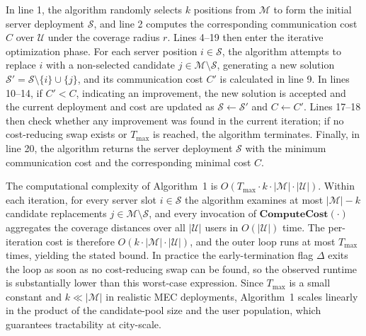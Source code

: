 \documentclass[10pt, conference, letterpaper]{IEEEtran}
\begin{document}
  In line 1, the algorithm randomly selects $k$ positions from $\mathcal{M}$ to form the initial server deployment
  $\mathcal{S}$, and line 2 computes the corresponding communication cost $C$ over $\mathcal{U}$ under the coverage
  radius $r$. Lines 4--19 then enter the iterative optimization phase. For each server position $i \in \mathcal{S}$, the
   algorithm attempts to replace $i$ with a non-selected candidate $j \in \mathcal{M} \setminus \mathcal{S}$, generating
   a new solution $\mathcal{S}' = \mathcal{S} \setminus \{i\} \cup \{j\}$, and its communication cost $C'$ is calculated
   in line 9. In lines 10--14, if $C' < C$, indicating an improvement, the new solution is accepted and the current
  deployment and cost are updated as $\mathcal{S} \leftarrow \mathcal{S}'$ and $C \leftarrow C'$. Lines 17--18 then
  check whether any improvement was found in the current iteration; if no cost-reducing swap exists or $T_{\max}$ is
  reached, the algorithm terminates. Finally, in line 20, the algorithm returns the server deployment $\mathcal{S}$ with
   the minimum communication cost and the corresponding minimal cost $C$.

The computational complexity of Algorithm~1 is $O(T_{\max} \cdot k \cdot |\mathcal{M}| \cdot |\mathcal{U}|)$. Within
  each iteration, for every server slot $i \in \mathcal{S}$ the algorithm examines at most $|\mathcal{M}| - k$ candidate
   replacements $j \in \mathcal{M} \setminus \mathcal{S}$, and every invocation of $\textbf{ComputeCost}(\cdot)$
  aggregates the coverage distances over all $|\mathcal{U}|$ users in $O(|\mathcal{U}|)$ time. The per-iteration cost is
   therefore $O(k \cdot |\mathcal{M}| \cdot |\mathcal{U}|)$, and the outer loop runs at most $T_{\max}$ times, yielding
  the stated bound. In practice the early-termination flag $\Delta$ exits the loop as soon as no cost-reducing swap can
  be found, so the observed runtime is substantially lower than this worst-case expression. Since $T_{\max}$ is a small
  constant and $k \ll |\mathcal{M}|$ in realistic MEC deployments, Algorithm~1 scales linearly in the product of the
  candidate-pool size and the user population, which guarantees tractability at city-scale.
\end{document}
